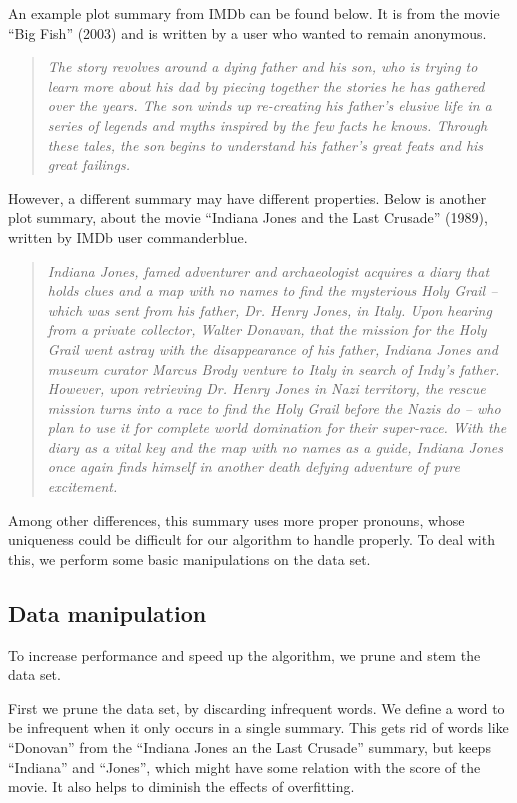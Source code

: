 \documentclass{article} %
\begin{document}
An example plot summary from IMDb can be found below. 
It is from the movie ``Big Fish'' (2003) and is written by a user who wanted to remain anonymous.
\begin{quotation}
  \emph{The story revolves around a dying father and his son, who is trying to learn more about his dad by piecing together the stories he has gathered over the years.
  The son winds up re-creating his father's elusive life in a series of legends and myths inspired by the few facts he knows.
  Through these tales, the son begins to understand his father's great feats and his great failings.}
\end{quotation}

However, a different summary may have different properties.
Below is another plot summary, about the movie ``Indiana Jones and the Last Crusade'' (1989), written by IMDb user commanderblue.
\begin{quotation}
  \emph{Indiana Jones, famed adventurer and archaeologist acquires a diary that holds clues and a map with no names to find the mysterious Holy Grail -- which was sent from his father, Dr. Henry Jones, in Italy. 
  Upon hearing from a private collector, Walter Donavan, that the mission for the Holy Grail went astray with the disappearance of his father, Indiana Jones and museum curator Marcus Brody venture to Italy in search of Indy's father. 
  However, upon retrieving Dr. Henry Jones in Nazi territory, the rescue mission turns into a race to find the Holy Grail before the Nazis do -- who plan to use it for complete world domination for their super-race. 
  With the diary as a vital key and the map with no names as a guide, Indiana Jones once again finds himself in another death defying adventure of pure excitement.}
\end{quotation}

Among other differences, this summary uses more proper pronouns, whose uniqueness could be difficult for our algorithm to handle properly.
To deal with this, we perform some basic manipulations on the data set.

\subsection{Data manipulation}
To increase performance and speed up the algorithm, we prune and stem the data set.

First we prune the data set, by discarding infrequent words. 
We define a word to be infrequent when it only occurs in a single summary. 
This gets rid of words like ``Donovan'' from the ``Indiana Jones an the Last Crusade'' summary, but keeps ``Indiana'' and ``Jones'', which might have some relation with the score of the movie. It also helps to diminish the effects of overfitting.
\end{document}
